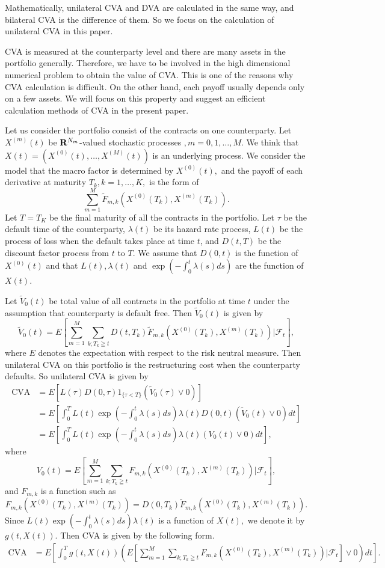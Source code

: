 \documentclass[12pt]{article}
\begin{document}
Mathematically, unilateral CVA and DVA are calculated in the same way, and bilateral CVA is the difference of them. So we focus on the calculation of 
unilateral CVA in this paper.

CVA is measured at the counterparty level and there are many assets in the portfolio generally.
Therefore, we have to be involved in the high dimensional numerical problem to obtain the value of CVA.
This is one of the reasons why CVA calculation is difficult.
On the other hand, each payoff usually depends only on a few assets.
We will focus on this property and suggest an efficient calculation methods of CVA 
in the present paper.

Let us consider the portfolio consist of the contracts on one counterparty. 
Let $X^{(m)}(t)$ be ${\bf R}^{N_m}$-valued
stochastic processes $, m=0, 1, \ldots, M.$ We think that $X(t)=(X^{(0)}(t),\ldots, X^{(M)}(t))$ is an underlying process. 
We consider the model that the macro factor is determined by $X^{(0)}(t),$ and the payoff of each derivative at maturity $T_k, k=1,\ldots,K,$ is the form of
$$\sum_{m=1}^M \tilde{F}_{m,k}(X^{(0)}(T_k), X^{(m)}(T_k)).$$
Let $T=T_K$ be the final maturity of all the contracts in the portfolio. Let $\tau$ be the default time of the counterparty, $\lambda(t)$ be its 
hazard rate process, $L(t)$ be the process of loss when the default takes place at time $t$, and $D(t,T)$ be the discount factor process from $t$ to $T$.
We assume that $D(0,t)$ is the function of $X^{(0)}(t)$ and that $L(t), \lambda(t)$ and $\exp(-\int_0^t \lambda(s)ds )$ are the function of $X(t).$   

Let $\tilde{V}_0(t)$ be total value of all contracts in the portfolio at time $t$ under the assumption that counterparty is default free. Then $\tilde{V}_0(t)$ is given by 
$$\tilde{V}_0(t) =E[\sum_{m=1}^M \sum_{k; T_k \geqq t}D(t,T_k)\tilde{F}_{m,k}(X^{(0)}(T_k), X^{(m)}(T_k)) | \mathcal{F}_t],$$
where $E$ denotes the expectation with respect to the risk neutral measure.
Then unilateral CVA on this portfolio is the restructuring cost when the counterparty
defaults.
So unilateral CVA is given by
\begin{align}
\text{CVA}&= E[L(\tau)D(0,\tau)1_{\{\tau <T\}}(\tilde{V}_0(\tau)\vee 0)] \nonumber\\
&=E[\int_0^T L(t)\exp(-\int_0^t \lambda(s)ds ) \lambda(t)D(0,t) (\tilde{V}_0(t) \vee 0)  dt ] \nonumber\\
&=E[\int_0^T L(t)\exp(-\int_0^t \lambda(s)ds ) \lambda(t) (V_0(t) \vee 0)  dt ] \label{defCVA},
\end{align}
where
$$V_0(t) =E[\sum_{m=1}^M \sum_{k; T_k \geqq t}F_{m,k}(X^{(0)}(T_k), X^{(m)}(T_k)) | \mathcal{F}_t],$$
and $F_{m,k}$ is a function such as 
$$F_{m,k}(X^{(0)}(T_k), X^{(m)}(T_k))=D(0,T_k)\tilde{F}_{m,k}(X^{(0)}(T_k), X^{(m)}(T_k)).$$
Since $L(t)\exp(-\int_0^t \lambda(s)ds ) \lambda(t)$ is a function of $X(t),$ we denote it by $g(t,X(t)).$ Then CVA is given by the following form. 
\begin{align}
\text{CVA}&=E[\int_0^T g(t,X(t))  (E[\sum_{m=1}^M \sum_{k; T_k \geqq t}F_{m,k}(X^{(0)}(T_k), X^{(m)}(T_k)) | \mathcal{F}_t] \vee 0)  dt ] \label{defCVA2}.
\end{align}
\end{document}
